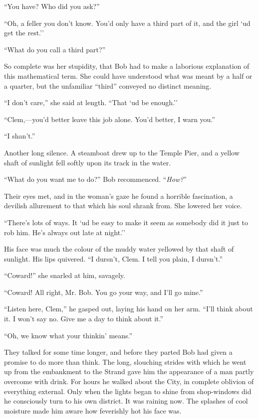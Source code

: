``You have? Who did you ask?''

``Oh, a feller you don't know. You'd only have a third part of it, and
the girl `ud get the rest.''

``What do you call a third part?''

So complete was her stupidity, that Bob had to make a laborious
explanation of this mathematical term. She could have understood what
was meant by a half or a quarter, but the unfamiliar ``third'' conveyed
no distinct meaning.

``I don't care,'' she said at length. ``That `ud be enough.''

``Clem,---you'd better leave this job alone. You'd better, I warn you.''

``I shan't.''

Another long silence. A steamboat drew up to the Temple Pier, and a
yellow shaft of sunlight fell softly upon its track in the water.

``What do you want me to do?'' Bob recommenced. ``\emph{How?}''

Their eyes met, and in the woman's gaze he {}found a horrible
fascination, a devilish allurement to that which his soul shrank from.
She lowered her voice.

``There's lots of ways. It `ud be easy to make it seem as somebody did
it just to rob him. He's always out late at night.''

His face was much the colour of the muddy water yellowed by that shaft
of sunlight. His lips quivered. ``I dursn't, Clem. I tell you plain, I
dursn't.''

``Coward!'' she snarled at him, savagely.

``Coward! All right, Mr. Bob. You go your way, and I'll go mine.''

``Listen here, Clem,'' he gasped out, laying his hand on her arm. ``I'll
think about it. I won't say no. Give me a day to think about it.''

``Oh, we know what your thinkin' means.''

They talked for some time longer, and before they parted Bob had given a
promise to do more than think. The long, slouching strides with which he
went up from the embankment to the Strand gave him the appearance of a
man partly overcome with drink. For hours he walked about the City, in
complete oblivion of {}everything external. Only when the lights began
to shine from shop-windows did he consciously turn to his own district.
It was raining now. The splashes of cool moisture made him aware how
feverishly hot his face was.

